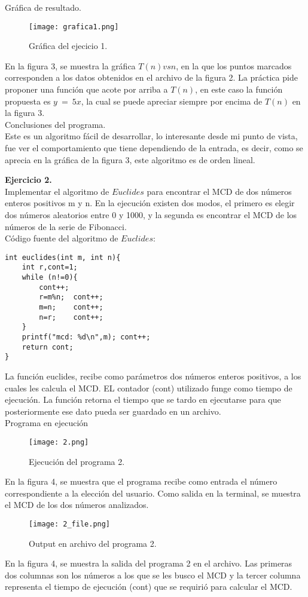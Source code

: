 \documentclass[12pt]{report}
\begin{document}
	Gráfica de resultado.\\
		\begin{figure}[H]
			\texttt{[image: grafica1.png]}
			\centering
			\caption{Gráfica del ejecicio 1.}
			\centering
		\end{figure}
	En la figura 3, se muestra la gráfica $T(n) vs n$, en la que los puntos marcados corresponden a los datos obtenidos en el archivo de la figura 2.
	La práctica pide proponer una función que acote por arriba a $T(n)$, en este caso la función propuesta es $y \ = \ 5x$, la cual se puede apreciar siempre por encima de $T(n)$ en la figura 3.\\
	
	Conclusiones del programa.\\
	Este es un algoritmo fácil de desarrollar, lo interesante desde mi punto de vista, fue ver el comportamiento que tiene dependiendo de la entrada, es decir, como se aprecia en la gráfica de la figura 3, este algoritmo es de orden lineal. \newpage
	
	\textbf{Ejercicio 2.}\\
	Implementar el algoritmo de $Euclides$ para encontrar el MCD de dos números enteros positivos m y n. En la ejecución existen dos modos, el primero es elegir dos números aleatorios entre 0 y 1000, y la segunda es encontrar el MCD de los números de la serie de Fibonacci.\newline \\
	Código fuente del algoritmo de $Euclides$:
	\lstset{language=C, breaklines=true, basicstyle=\footnotesize}
	\lstset{numbers=left, numberstyle=\tiny, stepnumber=1, numbersep=10pt}
	\begin{lstlisting}
int euclides(int m, int n){
	int r,cont=1;
	while (n!=0){
		cont++;
		r=m%n;	cont++;
		m=n;	cont++;	
		n=r;	cont++;
	}
	printf("mcd: %d\n",m); cont++;
	return cont;
}
	\end{lstlisting}
	
	La función euclides, recibe como parámetros dos números enteros positivos, a los cuales les calcula el MCD. EL contador (cont) utilizado funge como tiempo de ejecución. La función retorna el tiempo que se tardo en ejecutarse para que posteriormente ese dato pueda ser guardado en un archivo.\\
	
	
	Programa en ejecución\\
	\begin{figure}[H]
		\texttt{[image: 2.png]}
		\centering
		\caption{Ejecución del programa 2.}
		\centering
	\end{figure}
	En la figura 4, se muestra que el programa recibe como entrada el número correspondiente a la elección del usuario. Como salida en la terminal, se muestra el MCD de los dos números analizados.
	\begin{figure}[H]
		\texttt{[image: 2\_file.png]}
		\centering
		\caption{Output en archivo del programa 2.}
		\centering
	\end{figure}
	En la figura 4, se muestra la salida del programa 2 en el archivo. Las primeras dos columnas son los números a los que se les busco el MCD y la tercer columna representa el tiempo de ejecución (cont) que se requirió para calcular el MCD.\newpage
	
\end{document}
